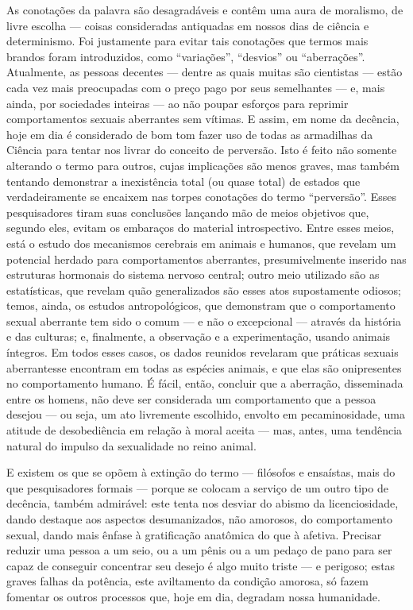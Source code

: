 As conotações da palavra\idxpervconot{} são desagradáveis e contêm uma aura de
moralismo, de livre escolha\idxlivre{} --- coisas consideradas antiquadas em nossos
dias de ciência e determinismo.\idxpervincid{} Foi justamente para evitar tais
conotações que termos mais brandos foram introduzidos, como
``variações'',\idxvaria{} ``desvios'' ou ``aberrações''. Atualmente, as pessoas
decentes --- dentre as quais muitas são cientistas --- estão cada vez mais
preocupadas com o preço pago por seus semelhantes --- e, mais ainda, por
sociedades inteiras --- ao não poupar esforços para reprimir
comportamentos sexuais aberrantes sem vítimas. E assim, em nome da
decência, hoje em dia é considerado de bom tom fazer uso de todas as
armadilhas da Ciência para tentar nos livrar do conceito de perversão.
Isto é feito não somente alterando o termo para outros, cujas
implicações são menos graves, mas também tentando demonstrar a
inexistência total (ou quase total) de estados que verdadeiramente se
encaixem nas torpes conotações do termo
``perversão''. Esses pesquisadores tiram suas
conclusões lançando mão de meios objetivos que, segundo eles, evitam
os embaraços do material introspectivo. Entre esses meios, está o
estudo dos mecanismos cerebrais em animais e humanos, que revelam um
potencial herdado para comportamentos aberrantes, presumivelmente
inserido nas estruturas hormonais do sistema nervoso central; outro
meio utilizado são as estatísticas, que revelam quão generalizados são
esses atos supostamente odiosos; temos, ainda, os estudos
antropológicos, que demonstram que o comportamento sexual aberrante tem
sido o comum --- e não o excepcional --- através da história e das
culturas; e, finalmente, a observação e a experimentação, usando
animais íntegros. Em todos esses casos, os dados reunidos revelaram que
práticas sexuais aberrantes\idxaberr[|)] se encontram em todas as espécies animais,
e que elas são onipresentes no comportamento humano. É fácil, então,
concluir que a aberração, disseminada entre os homens, não deve ser
considerada um comportamento que a pessoa desejou --- ou seja, um ato
livremente escolhido, envolto em pecaminosidade, uma atitude de
desobediência em relação à moral aceita ---\idxpervincid{} mas, antes, uma tendência
natural do impulso da sexualidade no reino animal.

 E existem os que se opõem à extinção do termo --- filósofos e
ensaístas, mais do que pesquisadores formais --- porque se colocam a
serviço de um outro tipo de decência, também admirável: este tenta nos
desviar do abismo da licenciosidade, dando destaque aos aspectos
desumanizados,\idxdesu{} não amorosos, do comportamento sexual, dando mais ênfase
à gratificação anatômica do que à afetiva. Precisar reduzir uma pessoa
a um seio,\idxseios{} ou a um pênis ou a um pedaço de pano para ser capaz de
conseguir concentrar seu desejo é algo muito triste --- e perigoso; estas
graves falhas da potência, este aviltamento da condição amorosa, só
fazem fomentar os outros processos que, hoje em dia, degradam nossa humanidade.

